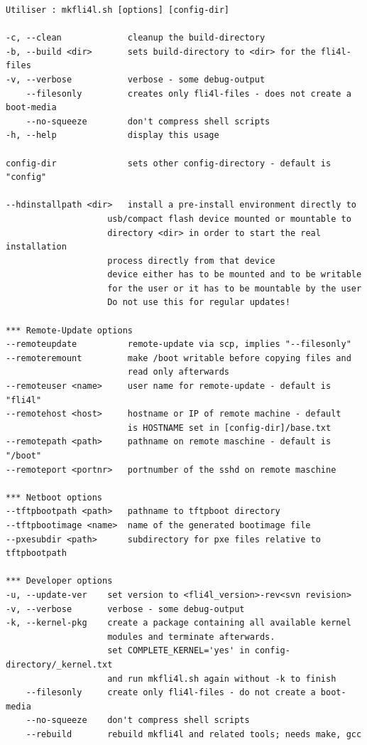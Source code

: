   \begin{verbatim}
Utiliser : mkfli4l.sh [options] [config-dir]

-c, --clean             cleanup the build-directory
-b, --build <dir>       sets build-directory to <dir> for the fli4l-files
-v, --verbose           verbose - some debug-output
    --filesonly         creates only fli4l-files - does not create a boot-media
    --no-squeeze        don't compress shell scripts
-h, --help              display this usage

config-dir              sets other config-directory - default is "config"

--hdinstallpath <dir>   install a pre-install environment directly to
                    usb/compact flash device mounted or mountable to
                    directory <dir> in order to start the real installation
                    process directly from that device
                    device either has to be mounted and to be writable
                    for the user or it has to be mountable by the user
                    Do not use this for regular updates!

*** Remote-Update options
--remoteupdate          remote-update via scp, implies "--filesonly"
--remoteremount         make /boot writable before copying files and
                        read only afterwards
--remoteuser <name>     user name for remote-update - default is "fli4l"
--remotehost <host>     hostname or IP of remote machine - default
                        is HOSTNAME set in [config-dir]/base.txt
--remotepath <path>     pathname on remote maschine - default is "/boot"
--remoteport <portnr>   portnumber of the sshd on remote maschine

*** Netboot options
--tftpbootpath <path>   pathname to tftpboot directory
--tftpbootimage <name>  name of the generated bootimage file
--pxesubdir <path>      subdirectory for pxe files relative to tftpbootpath

*** Developer options
-u, --update-ver    set version to <fli4l_version>-rev<svn revision>
-v, --verbose       verbose - some debug-output
-k, --kernel-pkg    create a package containing all available kernel
                    modules and terminate afterwards.
                    set COMPLETE_KERNEL='yes' in config-directory/_kernel.txt
                    and run mkfli4l.sh again without -k to finish
    --filesonly     create only fli4l-files - do not create a boot-media
    --no-squeeze    don't compress shell scripts
    --rebuild       rebuild mkfli4l and related tools; needs make, gcc
  \end{verbatim}

